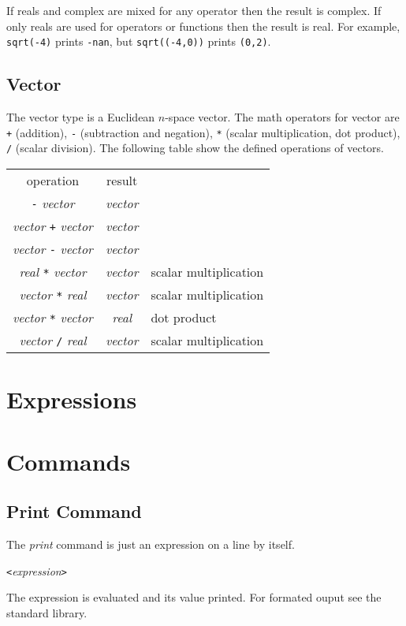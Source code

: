 \documentclass{article}
\begin{document}
If reals and complex are mixed for any operator then the result is complex.
If only reals are used for operators or functions then the result is real.
For example, \verb|sqrt(-4)| prints \verb|-nan|, but
\verb|sqrt((-4,0))| prints \verb|(0,2)|.

\subsection{Vector}

The vector type is a Euclidean $n$-space vector.
The math operators for vector are \verb|+| (addition),
\verb|-| (subtraction and negation), \verb|*| (scalar multiplication,
dot product), \verb|/| (scalar division).
The following table show the defined operations of vectors.
\begin{center}
  \begin{tabular}{ccl}
    operation & result \\
    \verb|-| \emph{vector} & \emph{vector} \\
    \emph{vector} \verb|+| \emph{vector} & \emph{vector} \\
    \emph{vector} \verb|-| \emph{vector} & \emph{vector} \\
    \emph{real} \verb|*| \emph{vector} & \emph{vector} & scalar multiplication \\ 
    \emph{vector} \verb|*| \emph{real} & \emph{vector} & scalar multiplication \\
    \emph{vector} \verb|*| \emph{vector} & \emph{real} & dot product \\
    \emph{vector} \verb|/| \emph{real} & \emph{vector} & scalar multiplication \\
  \end{tabular}
\end{center}

\section{Expressions}
\section{Commands}
\subsection{Print Command}
The \emph{print} command is just an expression on a line by itself.
\begin{center}
  \verb|<|\emph{expression}\verb|>|
\end{center}
The expression is evaluated and its value printed.
For formated ouput see the standard library.
\end{document}
